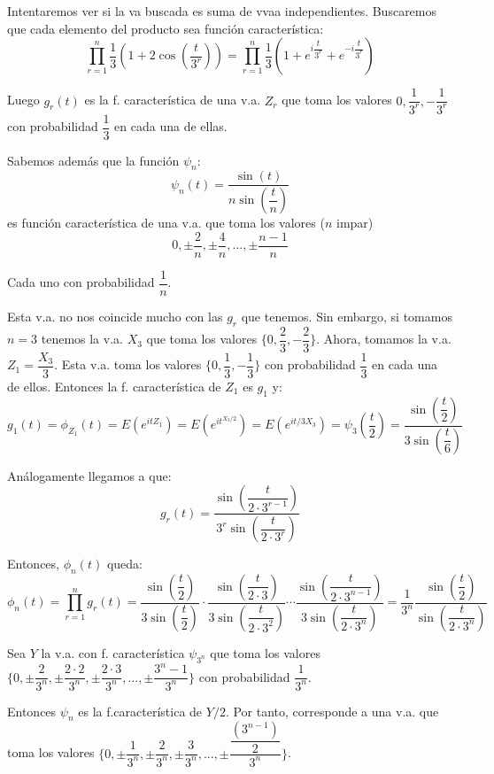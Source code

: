 \documentclass[openany]{book}
\begin{document}
\begin{exercise}
    $  $\\ 
    Intentaremos ver si la va buscada es suma de vvaa independientes. Buscaremos que cada elemento del producto sea función característica:
    $$ \prod_{r=1}^{n}\dfrac{1}{3} \left(1+2 \cos\left(\dfrac{t}{3^{r}}\right)\right) = \prod_{r=1}^{n}\dfrac{1}{3} \left( 1+e^{i \dfrac{t}{3^{r}}} + e^{-i \dfrac{t}{3^{r}}} \right) $$

    Luego $ g_{r}(t)  $ es la f. característica de una v.a. $ Z_{r} $ que toma los valores $ 0,\dfrac{1}{3^{r}},-\dfrac{1}{3^{r}} $ con probabilidad $ \dfrac{1}{3} $ en cada una de ellas.

    Sabemos además que la función $ \psi_n $:
    $$ \psi_n(t) = \dfrac{\sin(t)}{n \sin\left(\dfrac{t}{n}\right)} $$
    es función característica de una v.a. que toma los valores ($ n  $ impar) 
    $$ 0, \pm \dfrac{2}{n}, \pm \dfrac{4}{n},..., \pm \dfrac{n-1}{n} $$

    Cada uno con probabilidad $ \dfrac{1}{n} $. 

    Esta v.a. no nos coincide mucho con las $ g_{r} $ que tenemos. Sin embargo, si tomamos $ n = 3 $ tenemos la v.a. $ X_3 $ que toma los valores $ \{0,\dfrac{2}{3},-\dfrac{2}{3}\} $. Ahora, tomamos la v.a. $ Z_1 = \dfrac{X_3}{3} $. Esta v.a. toma los valores $ \{0,\dfrac{1}{3},-\dfrac{1}{3}\} $ con probabilidad $ \dfrac{1}{3} $ en cada una de ellos. Entonces la f. característica de $ Z_1 $ es $ g_1 $ y:
    $$ g_1(t) = \phi_{Z_1}(t) = E(e^{itZ_1}) = E(e^{it^{X_3/2}}) = E(e^{it/3X_3}) = \psi_{3}\left(\dfrac{t}{2}\right) = \dfrac{\sin\left(\dfrac{t}{2}\right)}{3 \sin\left(\dfrac{t}{6}\right)} $$ 

    Análogamente llegamos a que:
    $$ g_{r}(t) = \dfrac{\sin\left(\dfrac{t}{2\cdot 3^{r-1}}\right)}{3^{r}\sin\left(\dfrac{t}{2\cdot 3^{r}}\right)} $$

    Entonces, $ \phi_n(t) $ queda:
    $$ \phi_n(t) = \prod_{r=1}^{n}g_{r}(t) = \dfrac{\sin\left(\dfrac{t}{2}\right)}{3 \sin\left(\dfrac{t}{2}\right)} \cdot  \dfrac{\sin(\dfrac{t}{2\cdot 3})}{3 \sin\left(\dfrac{t}{2\cdot 3^2}\right)}\cdots \dfrac{\sin\left(\dfrac{t}{2\cdot 3^{n-1}}\right)}{3 \sin\left(\dfrac{t}{2\cdot 3^{n}}\right)} = \dfrac{1}{3^{n}} \dfrac{\sin(\dfrac{t}{2})}{\sin(\dfrac{t}{2\cdot 3^{n}})} $$

    Sea $ Y $ la v.a. con f. característica $ \psi_{3^{n}} $ que toma los valores $ \{0,\pm \dfrac{2}{3^{n}},\pm \dfrac{2\cdot 2}{3^{n}},\pm \dfrac{2\cdot 3}{3^{n}},..., \pm \dfrac{3^{n}-1}{3^{n}}\} $ con probabilidad $ \dfrac{1}{3^{n}} $.
    
    Entonces $ \psi_n $ es la f.característica de $ Y/2 $. Por tanto, corresponde a una v.a. que toma los valores $ \{0,\pm \dfrac{1}{3^{n}},\pm \dfrac{2}{3^{n}},\pm \dfrac{3}{3^{n}},...,\pm \dfrac{\dfrac{(3^{n-1})}{2}}{3^{n}}\} $.
\end{exercise}
\end{document}
